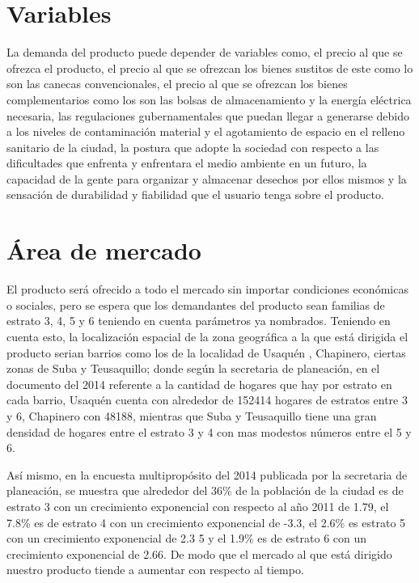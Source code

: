 \documentclass{report}
\begin{document}
    \section{Variables}
    La demanda del producto puede depender de variables como, el precio al que se ofrezca el producto, el precio al que se ofrezcan los bienes sustitos de este como lo son las canecas convencionales, el precio al que se ofrezcan los bienes complementarios como los son las bolsas de almacenamiento y la energía eléctrica necesaria,  las regulaciones gubernamentales que puedan llegar a generarse debido a los niveles de contaminación material y el agotamiento de espacio en el relleno sanitario de la ciudad,  la postura que adopte la sociedad con respecto a las dificultades que enfrenta y enfrentara el medio ambiente en un futuro, la capacidad de la gente para organizar y almacenar desechos por ellos mismos y la sensación de durabilidad y fiabilidad que el usuario tenga sobre el producto.

    \section{Área de mercado}
    El producto será ofrecido a todo el mercado sin importar condiciones económicas o sociales, pero se espera que los demandantes del producto sean  familias de estrato 3, 4, 5 y 6 teniendo en cuenta parámetros ya nombrados. Teniendo en cuenta esto, la localización espacial de la zona geográfica a la que está dirigida el producto serian barrios como los de la localidad de Usaquén , Chapinero, ciertas zonas de Suba y Teusaquillo; donde según la secretaria de planeación, en el documento del 2014 referente a la cantidad de hogares que hay por estrato en cada barrio, Usaquén cuenta con alrededor de 152414 hogares de estratos entre 3 y 6, Chapinero con 48188, mientras que Suba y Teusaquillo tiene una gran densidad de hogares entre el estrato 3 y 4 con mas modestos números entre el 5 y 6.

    Así mismo, en la encuesta multipropósito del 2014 publicada por la secretaria de planeación, se muestra que  alrededor del 36\% de la población de la ciudad es de estrato 3 con un crecimiento exponencial con respecto al año 2011 de 1.79, el 7.8\%  es de estrato 4 con un crecimiento exponencial de -3.3, el 2.6\% es estrato 5 con un crecimiento exponencial de 2.3 5 y el 1.9\% es de estrato 6 con un crecimiento exponencial de 2.66. De modo que el mercado al que está dirigido nuestro producto tiende a aumentar con respecto al tiempo.
\end{document}
